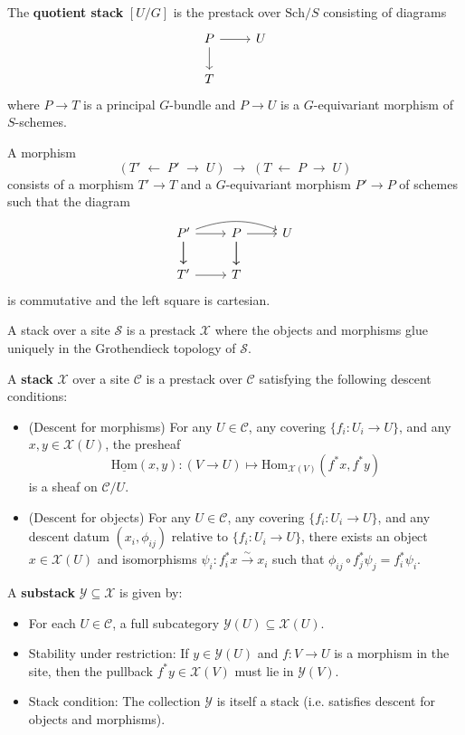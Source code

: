 \documentclass[12pt]{article}
\begin{document}
\begin{definition}
The \textbf{quotient stack} $[U/G]$ is the prestack over $\mathrm{Sch}/S$ consisting of diagrams
\[
\begin{tikzcd}
P \arrow[r] \arrow[d] & U \\
T
\end{tikzcd}
\]
where $P \to T$ is a principal $G$-bundle and $P \to U$ is a $G$-equivariant morphism of $S$-schemes. 

A morphism 
\[
(T' \;\longleftarrow\; P' \;\longrightarrow\; U) \;\longrightarrow\; 
(T \;\longleftarrow\; P \;\longrightarrow\; U)
\]
consists of a morphism $T' \to T$ and a $G$-equivariant morphism $P' \to P$ of schemes such that the diagram
\[
\begin{tikzcd}
P' \arrow[r] \arrow[d] \arrow[rr, bend left=20] & 
P \arrow[r] \arrow[d] & 
U \\
T' \arrow[r] & T & 
\arrow[from=1-1, to=2-1]
\arrow[from=1-2, to=2-2]
\end{tikzcd}
\]
is commutative and the left square is cartesian.
\end{definition}

A stack over a site $\mathcal{S}$ is a prestack $\mathcal{X}$ where the objects and morphisms glue uniquely in the Grothendieck topology of $\mathcal{S}$.

\begin{definition}
    [Stack] \label{def:stack}
    A \textbf{stack} $\mathcal{X}$ over a site $\mathcal{C}$ is a prestack over $\mathcal{C}$ satisfying the following descent conditions:
\begin{itemize}
    \item (Descent for morphisms) For any $U\in\mathcal{C}$, any covering $\{f_i:U_i\to U\}$, and any $x,y\in\mathcal{X}(U)$, the presheaf
    \[
    \underline{\mathrm{Hom}}(x,y): (V\to U) \mapsto \mathrm{Hom}_{\mathcal{X}(V)}(f^*x,f^*y)
    \]
    is a sheaf on $\mathcal{C}/U$.
    \item (Descent for objects) For any $U\in\mathcal{C}$, any covering $\{f_i:U_i\to U\}$, and any descent datum $(x_i,\phi_{ij})$ relative to $\{f_i:U_i\to U\}$, there exists an object $x\in\mathcal{X}(U)$ and isomorphisms $\psi_i:f_i^*x\xrightarrow{\sim} x_i$ such that $\phi_{ij}\circ f_j^*\psi_j = f_i^*\psi_i$.
\end{itemize}
\end{definition}

\begin{definition}[Substack]
    A \textbf{substack} $\mathcal{Y}\subseteq \mathcal{X}$ is given by:
\begin{itemize}
    \item For each $U\in\mathcal{C}$, a full subcategory $\mathcal{Y}(U)\subseteq \mathcal{X}(U)$.
    \item Stability under restriction:
    If $y\in \mathcal{Y}(U)$ and $f:V\to U$ is a morphism in the site, then the pullback $f^*y \in \mathcal{X}(V)$ must lie in $\mathcal{Y}(V)$.
    \item Stack condition:
    The collection $\mathcal{Y}$ is itself a stack (i.e. satisfies descent for objects and morphisms).
\end{itemize}
\end{definition}
\end{document}
